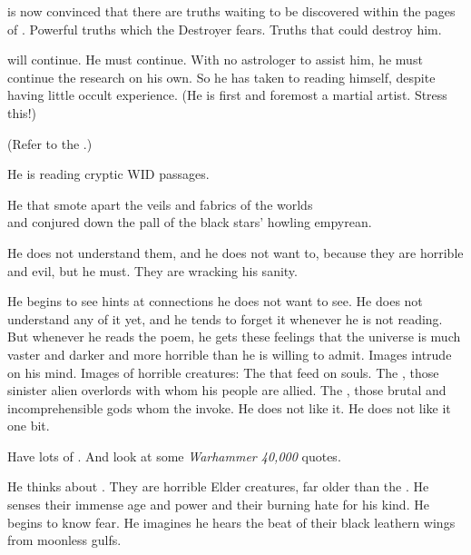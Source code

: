 \Teshrial is now convinced that there are truths waiting to be discovered within the pages of \WanderersInDarknessEmph. 
Powerful truths which the Destroyer fears. 
Truths that could destroy him. 

\Teshrial will continue. 
He must continue. 
With no astrologer to assist him, he must continue the research on his own. 
So he has taken to reading \WanderersInDarknessEmph himself, despite having little occult experience. 
(He is first and foremost a martial artist. Stress this!)

(Refer to the .)

He is reading cryptic WID passages. 

\begin{poetry}
  He that smote apart the veils and fabrics of the worlds\\
  and conjured down the pall of the black stars' howling empyrean.
\end{poetry}

He does not understand them, and he does not want to, because they are horrible and evil, but he must. 
They are wracking his sanity. 

He begins to see hints at connections he does not want to see. 
He does not understand any of it yet, and he tends to forget it whenever he is not reading. 
But whenever he reads the poem, he gets these feelings that the universe is much vaster and darker and more horrible than he is willing to admit. 
Images intrude on his mind. 
Images of horrible creatures: 
The \umbrae that feed on \resphan souls. 
The \banes, those sinister alien overlords with whom his people are allied. 
The \xzaishanns, those brutal and incomprehensible gods whom the \dragons invoke. 
He does not like it. 
He does not like it one bit. 

Have lots of . 
And look at some \emph{Warhammer 40,000} quotes. 

He thinks about \dragons.
They are horrible Elder creatures, far older than the \resphain. 
He senses their immense age and power and their burning hate for his kind. 
He begins to know fear. 
He imagines he hears the beat of their black leathern wings from moonless gulfs. 


